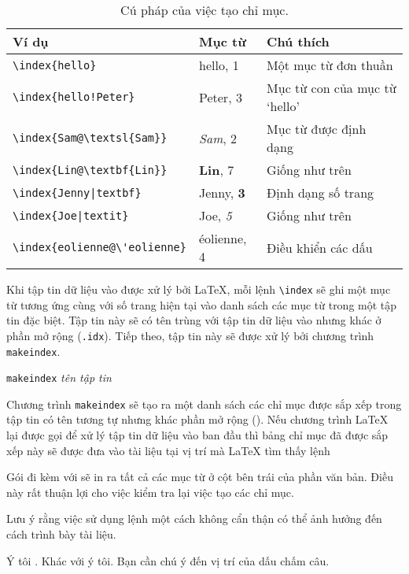 \begin{table}[!tbp]
\caption{Cú pháp của việc tạo chỉ mục.} \label{index}
\begin{center}
\begin{tabular}{@{}lll@{}}
  \textbf{Ví dụ} &\textbf{Mục từ} &\textbf{Chú thích}\\\hline
  \rule{0pt}{1.05em}\verb|\index{hello}| &hello, 1 &Một mục từ đơn thuần\\
\verb|\index{hello!Peter}|   &\hspace*{2ex}Peter, 3 &Mục từ con của mục từ `hello'\\
\verb|\index{Sam@\textsl{Sam}}|     &\textsl{Sam}, 2& Mục từ được định dạng\\
\verb|\index{Lin@\textbf{Lin}}|     &\textbf{Lin}, 7& Giống như trên\\
\verb.\index{Jenny|textbf}.     &Jenny, \textbf{3}& Định dạng số trang\\
\verb.\index{Joe|textit}.     &Joe, \textit{5}& Giống như trên\\
\verb.\index{eolienne@\'eolienne}.     &\'eolienne, 4& Điều khiển
các dấu
\end{tabular}
\end{center}
\end{table}

Khi tập tin dữ liệu vào được xử lý bởi \LaTeX{}, mỗi lệnh \verb|\index| sẽ ghi một mục từ tương ứng cùng với số trang hiện
tại vào danh sách các mục từ trong một tập tin đặc biệt. Tập tin này sẽ có tên trùng với tập tin dữ liệu vào nhưng khác ở phần mở rộng (\verb|.idx|). Tiếp theo, tập tin  này sẽ được xử lý bởi chương trình \texttt{makeindex}.
\begin{lscommand}
  \texttt{makeindex} \emph{tên tập tin}
\end{lscommand}
Chương trình \texttt{makeindex} sẽ tạo ra một danh sách các chỉ mục được sắp xếp trong tập tin có tên tương tự nhưng khác phần mở rộng (). Nếu chương trình \LaTeX{} lại được gọi để xử lý tập tin dữ liệu vào ban đầu thì bảng chỉ mục đã được sắp xếp này sẽ được đưa vào tài liệu tại vị trí mà \LaTeX{} tìm thấy lệnh
\begin{lscommand}
\end{lscommand}
Gói  đi kèm với \LaTeXe{} sẽ in ra tất cả các mục từ ở cột bên trái của phần văn bản. Điều này rất thuận lợi cho việc kiểm tra lại việc tạo các chỉ mục.

Lưu ý rằng việc sử dụng lệnh  một cách không cẩn thận có thể ảnh hưởng đến cách trình bày tài liệu.
\begin{example}
Ý tôi . Khác với
ý tôi. Bạn cần chú ý
đến vị trí của dấu chấm câu.
\end{example}


